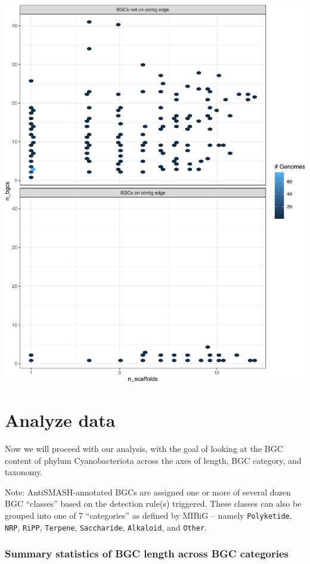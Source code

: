 \documentclass[
]{article}
\begin{document}
\includegraphics{analysis_files/figure-latex/unnamed-chunk-5-1.pdf}

\hypertarget{analyze-data}{%
\section{Analyze data}\label{analyze-data}}

Now we will proceed with our analysis, with the goal of looking at the
BGC content of phylum Cyanobacteriota across the axes of length, BGC
category, and taxonomy.

Note: AntiSMASH-annotated BGCs are assigned one or more of several dozen
BGC ``classes'' based on the detection rule(s) triggered. These classes
can also be grouped into one of 7 ``categories'' as defined by MIBiG --
namely \texttt{Polyketide}, \texttt{NRP}, \texttt{RiPP},
\texttt{Terpene}, \texttt{Saccharide}, \texttt{Alkaloid}, and
\texttt{Other}.

\hypertarget{summary-statistics-of-bgc-length-across-bgc-categories}{%
\subsubsection{Summary statistics of BGC length across BGC
categories}\label{summary-statistics-of-bgc-length-across-bgc-categories}}
\end{document}

